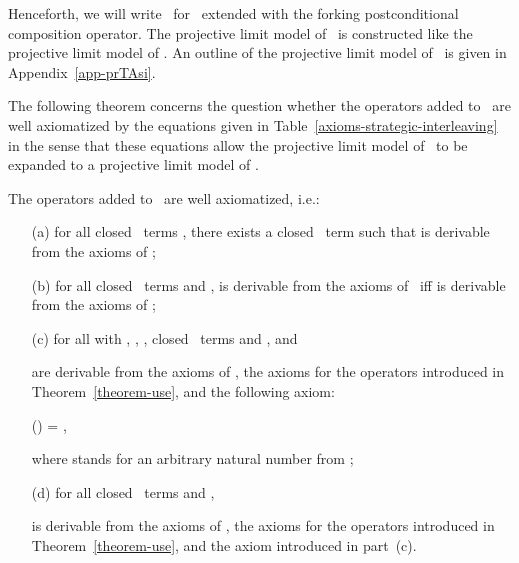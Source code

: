 \documentclass{llncs}
\begin{document}
Henceforth, we will write \prBTAnt\ for \prBTA\ extended with the 
forking postconditional composition operator.
The projective limit model of \prBTAnt\ is constructed like the 
projective limit model of \prBTA.
An outline of the projective limit model of \prBTAnt\ is given in 
Appendix~\ref{app-prTAsi}.

The following theorem concerns the question whether the operators added
to \prBTAnt\ are well axiomatized by the equations given in 
Table~\ref{axioms-strategic-interleaving} in the sense that these 
equations allow the projective limit model of \prBTAnt\ to be expanded 
to a projective limit model of \prTA.
\begin{theorem}
\label{theorem-si}
The operators added to \prBTAnt\ are well axiomatized, i.e.:
\begin{enumerate}
\item[(a)]
for all closed \prTA\ terms , there exists a closed \prBTAnt\ term 
 such that  is derivable from the axioms of \prTA;
\item[(b)]
for all closed \prBTAnt\ terms  and ,
 is derivable from the axioms of \prBTAnt\ iff
 is derivable from the axioms of \prTA;
\item[(c)]
for all  with , , , 
closed \prTA\ terms  and , 
 and
 
are derivable from the axioms of \prTA, the axioms for the operators 
 introduced in Theorem~\ref{theorem-use}, and
the following axiom:
\begin{ldispl}
\begin{geqns}
() = 
\;,              
\end{geqns}
\end{ldispl}where  stands for an arbitrary natural number from ;
\item[(d)]
for all closed \prTA\ terms  and , 
 
is derivable from the axioms of \prTA, the axioms for the operators 
 introduced in Theorem~\ref{theorem-use}, and the axiom
introduced in part~(c).
\end{enumerate}
\end{theorem}
\end{document}
